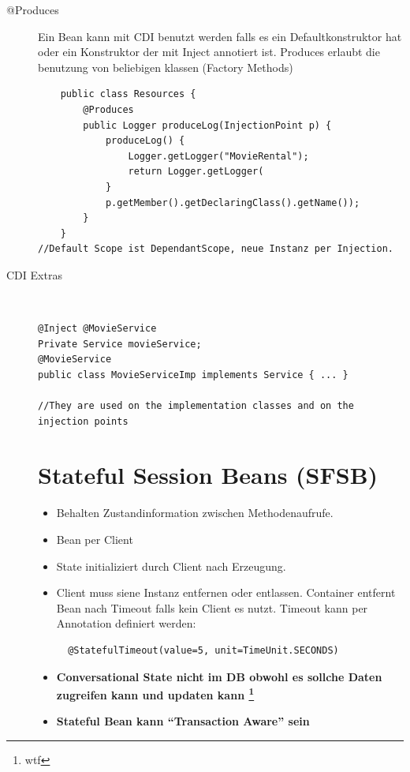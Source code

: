 \documentclass[a4paper,10pt]{scrreprt}
\begin{document}
\begin{description}
 \item [@Produces] Ein Bean kann mit CDI benutzt werden falls es ein Defaultkonstruktor hat oder ein Konstruktor der 
mit Inject annotiert ist.
Produces erlaubt die benutzung von beliebigen klassen (Factory Methods)

\begin{lstlisting}
	public class Resources {
		@Produces
		public Logger produceLog(InjectionPoint p) {
			produceLog() {
				Logger.getLogger("MovieRental");
				return Logger.getLogger(
			}
			p.getMember().getDeclaringClass().getName());
		}
	}
//Default Scope ist DependantScope, neue Instanz per Injection.
\end{lstlisting}

\item[CDI Extras] \hfill \\
\begin{lstlisting}[caption=CDI mit Qualifier]
 @Inject @MovieService
Private Service movieService;
@MovieService
public class MovieServiceImp implements Service { ... }

//They are used on the implementation classes and on the injection points

\end{lstlisting}

\chapter{Stateful Session Beans (SFSB)}
\begin{itemize}
 \item Behalten Zustandinformation zwischen Methodenaufrufe.
 \item Bean per Client
 \item State initializiert durch Client nach Erzeugung.
 \item Client muss siene Instanz entfernen oder entlassen.
 \subitem Container entfernt Bean nach Timeout falls kein Client es nutzt.
 \subitem Timeout kann per Annotation definiert werden: \\
 \begin{verbatim}
  @StatefulTimeout(value=5, unit=TimeUnit.SECONDS)
 \end{verbatim}
\item \textbf{Conversational State nicht im DB obwohl es sollche Daten zugreifen kann und updaten kann \footnote{wtf}}
\item \textbf{Stateful Bean kann ``Transaction Aware'' sein}
\end{itemize}

\end{description}
\end{document}
